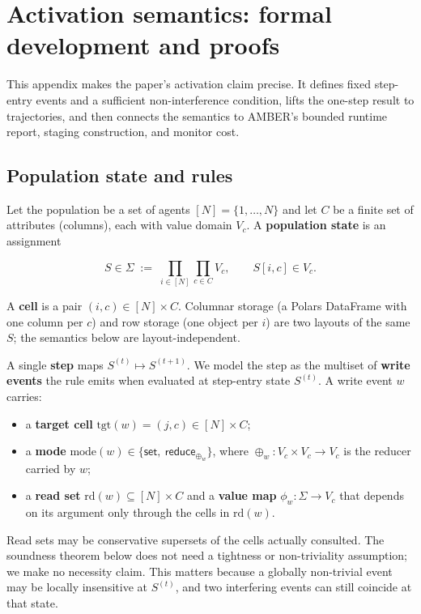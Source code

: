 \documentclass[sigconf,nonacm,review,natbib=true]{acmart}
\newcommand{\appendixfigurelayout}{%
  \clearpage
  \onecolumn
  \raggedbottom
}
\theoremstyle{definition}
\theoremstyle{plain}
\theoremstyle{remark}
\begin{document}
\appendix
\setcounter{tocdepth}{2}
\appendixfigurelayout

\section{Activation semantics: formal development and proofs}
\label{app:theory}

This appendix makes the paper's activation claim precise. It defines fixed
step-entry events and a sufficient non-interference condition, lifts the
one-step result to trajectories, and then connects the semantics to AMBER's
bounded runtime report, staging construction, and monitor cost.

\subsection{Population state and rules}\label{ax:pop}

Let the population be a set of agents $[N]=\{1,\dots,N\}$ and let $C$ be a finite set of attributes (columns), each with value domain $V_c$. A \textbf{population state} is an assignment

\[
S \in \Sigma \;:=\; \prod_{i\in[N]}\prod_{c\in C} V_c ,
\qquad S[i,c]\in V_c .
\]

A \textbf{cell} is a pair $(i,c)\in[N]\times C$. Columnar storage (a Polars DataFrame with one column per $c$) and row storage (one object per $i$) are two layouts of the same $S$; the semantics below are layout-independent.

A single \textbf{step} maps $S^{(t)}\mapsto S^{(t+1)}$. We model the step as the multiset of \textbf{write events} the rule emits when evaluated at step-entry state $S^{(t)}$. A write event $w$ carries:

\begin{itemize}
\item a \textbf{target cell} $\mathrm{tgt}(w)=(j,c)\in[N]\times C$;
\item a \textbf{mode} $\mathrm{mode}(w)\in\{\textsf{set},\
\textsf{reduce}_{\oplus_w}\}$, where $\oplus_w:V_c\times V_c\to V_c$
is the reducer carried by $w$;
\item a \textbf{read set} $\mathrm{rd}(w)\subseteq[N]\times C$ and a \textbf{value map} $\phi_w:\Sigma\to V_c$ that depends on its argument only through the cells in $\mathrm{rd}(w)$.
\end{itemize}

Read sets may be conservative supersets of the cells actually consulted. The
soundness theorem below does not need a tightness or non-triviality assumption;
we make no necessity claim. This matters because a globally non-trivial event
may be locally insensitive at $S^{(t)}$, and two interfering events can still
coincide at that state.
\end{document}
